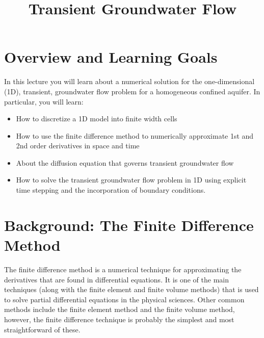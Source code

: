 \documentclass[11pt, oneside]{article}   	%
\date{}							%
\begin{document}
\title{\bf Transient Groundwater Flow}
\maketitle
 
\section*{Overview and Learning Goals}
In this lecture you will learn about a numerical solution for the one-dimensional (1D), transient, groundwater flow problem for a homogeneous confined aquifer.  In particular, you will learn:
\begin{itemize}
\item How to discretize a 1D model into finite width cells
\item How to use the finite difference method to  numerically approximate 1st and 2nd order derivatives in space and time
\item About the  diffusion equation that governs  transient groundwater flow
\item How to solve the transient groundwater flow problem in 1D using explicit time stepping and the incorporation of boundary conditions.
\end{itemize}

\section*{Background: The Finite Difference Method}
 The finite difference method is a numerical technique for approximating the derivatives that are found in differential equations.  It is one of the main techniques (along with the finite element and finite volume methods) that is used to solve partial differential equations in the physical sciences. Other common methods include the finite element method and the finite volume method, however, the finite difference technique is probably the simplest and most straightforward  of these.
 
\end{document}
